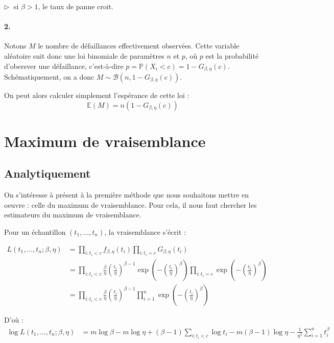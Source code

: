 \documentclass[a4paper]{report}
\begin{document}
  $\triangleright \; $ si $\beta>1$, le taux de panne croit.
  
  \subsubsection{2.}
  Notons $M$ le nombre de défaillances effectivement observées. Cette variable aléatoire suit donc une loi binomiale de paramètres $n$ et $p$, où $p$ est la probabilité d'obersver une défaillance, c'est-à-dire $p=\mathbb{P}(X_i<c)=1-G_{\beta,\eta}(c)$. Schématiquement, on a donc $M \sim \mathcal{B}(n,1-G_{\beta,\eta}(c))$.
  
  On peut alors calculer simplement l'espérance de cette loi :
  \[\mathbb{E}(M)=n(1-G_{\beta,\eta}(c))\]
  
  
  \chapter {Maximum de vraisemblance}
  
    \section{Analytiquement \label{sec:calculEMV}}
    
    On s'intéresse à présent à la première méthode que nous souhaitons mettre en oeuvre : celle du maximum de vraisemblance. Pour cela, il nous faut chercher les estimateurs du maximum de vraisemblance.
    
    Pour un échantillon $(t_1,...,t_n)$, la vraisemblance s'écrit :
    
    \begin{align*}
	L(t_1,...,t_n;\beta,\eta) & = \prod_{i:t_i<c} {f_{\beta,\eta}(t_i)}  \prod_{i:t_i=c} {G_{\beta,\eta}(t_i)} \\
	& =  \prod_{i:t_i<c}{\frac{\beta}{\eta} \left(\frac{t_i}{\eta}\right)^{\beta-1}\exp\left(-\left(\frac{t_i}{\eta}\right)^{\beta}\right) }  \prod_{i:t_i=c} {\exp\left(-\left(\frac{t_i}{\eta}\right)^{\beta}\right)}\\
	& = \prod_{i:t_i<c}{\frac{\beta}{\eta} \left(\frac{t_i}{\eta}\right)^{\beta-1} }  \prod_{i=1}^{n} {\exp\left(-\left(\frac{t_i}{\eta}\right)^{\beta}\right)}
	\end{align*}
	
	D'où :
	\begin{align*}
	\log L(t_1,...,t_n;\beta,\eta) & = m \log \beta - m\log \eta + (\beta-1)\sum_{i:t_i<c}{\log t_i} - m(\beta-1)\log \eta - \frac{1}{\eta^\beta} \sum_{i=1}^{n} {t_i^\beta}
     \end{align*}
     
\end{document}
